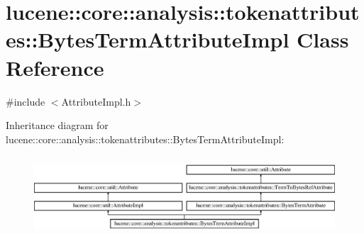 \hypertarget{classlucene_1_1core_1_1analysis_1_1tokenattributes_1_1BytesTermAttributeImpl}{}\section{lucene\+:\+:core\+:\+:analysis\+:\+:tokenattributes\+:\+:Bytes\+Term\+Attribute\+Impl Class Reference}
\label{classlucene_1_1core_1_1analysis_1_1tokenattributes_1_1BytesTermAttributeImpl}


{\ttfamily \#include $<$Attribute\+Impl.\+h$>$}

Inheritance diagram for lucene\+:\+:core\+:\+:analysis\+:\+:tokenattributes\+:\+:Bytes\+Term\+Attribute\+Impl\+:\begin{figure}[H]
\begin{center}
\leavevmode
\includegraphics[height=2.994652cm]{classlucene_1_1core_1_1analysis_1_1tokenattributes_1_1BytesTermAttributeImpl}
\end{center}
\end{figure}
